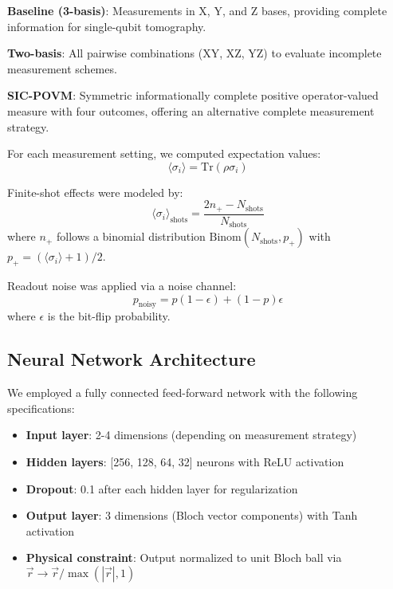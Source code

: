 \documentclass[conference]{IEEEtran}
\begin{document}
\textbf{Baseline (3-basis)}: Measurements in X, Y, and Z bases, providing complete information for single-qubit tomography.

\textbf{Two-basis}: All pairwise combinations (XY, XZ, YZ) to evaluate incomplete measurement schemes.

\textbf{SIC-POVM}: Symmetric informationally complete positive operator-valued measure with four outcomes, offering an alternative complete measurement strategy.

For each measurement setting, we computed expectation values:
\begin{equation}
\langle \sigma_i \rangle = \text{Tr}(\rho \sigma_i)
\end{equation}

Finite-shot effects were modeled by:
\begin{equation}
\langle \sigma_i \rangle_{\text{shots}} = \frac{2n_+ - N_{\text{shots}}}{N_{\text{shots}}}
\end{equation}
where $n_+$ follows a binomial distribution $\text{Binom}(N_{\text{shots}}, p_+)$ with $p_+ = (\langle \sigma_i \rangle + 1)/2$.

Readout noise was applied via a noise channel:
\begin{equation}
p_{\text{noisy}} = p(1-\epsilon) + (1-p)\epsilon
\end{equation}
where $\epsilon$ is the bit-flip probability.

\subsection{Neural Network Architecture}

We employed a fully connected feed-forward network with the following specifications:

\begin{itemize}
    \item \textbf{Input layer}: 2-4 dimensions (depending on measurement strategy)
    \item \textbf{Hidden layers}: [256, 128, 64, 32] neurons with ReLU activation
    \item \textbf{Dropout}: 0.1 after each hidden layer for regularization
    \item \textbf{Output layer}: 3 dimensions (Bloch vector components) with Tanh activation
    \item \textbf{Physical constraint}: Output normalized to unit Bloch ball via $\vec{r} \rightarrow \vec{r} / \max(|\vec{r}|, 1)$
\end{itemize}
\end{document}
